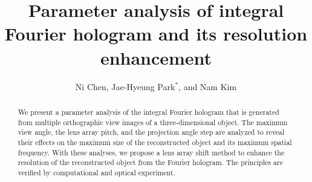 \documentclass[10pt,letterpaper]{article}
\begin{document}
\graphicspath{{figures/}}

\title{Parameter analysis of integral Fourier hologram and its resolution enhancement}

\author{Ni Chen, Jae-Hyeung Park$^{*}$, and Nam Kim}

\address{School of Electrical \& Computer Engineering, Chungbuk National University, 410 SungBong-Ro, Heungduk-Gu Cheongju-Si, Chungbuk, 361-763, Korea.}




\begin{abstract}
We present a parameter analysis of the integral Fourier hologram that is generated from multiple orthographic view images of a three-dimensional object. The maximum view angle, the lens array pitch, and the projection angle step are analyzed to reveal their effects on the maximum size of the reconstructed object and its maximum spatial frequency. With these analyses, we propose a lens array shift method to enhance the resolution of the reconstructed object from the Fourier hologram. The principles are verified by computational and optical experiment.
\end{abstract}

\end{document}
